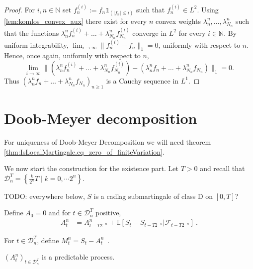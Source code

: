 \begin{proof}
  For $i,n\in\mathbb{N}$ set $f_{n}^{(i)}:=f_n \mathbb{1}_{(|f_n|\leq i)}$ such that $f_{n}^{(i)}\in L^2$.
  Using \ref{lem:komlos_convex_aux} there exist for every $n$ convex weights $\lambda_n^{n}, \ldots, \lambda_{N_n}^{n}$ such that the functions
  $ \lambda_n^{n} f_n^{(i)} + \ldots+\lambda_{N_n}^{n} f_{N_n}^{(i)}$ converge in $L^2$ for every $i\in\mathbb{N}$.
  By uniform integrability, $\lim_{i\to \infty}\| f^{(i)}_n- f_n\|_1=0$, uniformly with respect to $n$.
  Hence, once again, uniformly with respect to $n$,
  $$ \textstyle\lim_{i\to\infty}\|  (\lambda_n^{n} f_n^{(i)} + \ldots+\lambda_{N_n}^{n} f_{N_n}^{(i)})-(\lambda_n^{n} f_n + \ldots+\lambda_{N_n}^{n} f_{N_n})\|_1= 0.$$
  Thus $(\lambda_n^{n} f_n + \ldots+\lambda_{N_n}^{n} f_{N_n})_{n\geq 1}$  is a Cauchy sequence in $L^1$.
\end{proof}



\section{Doob-Meyer decomposition}



For uniqueness of Doob-Meyer Decomposition we will need theorem \ref{thm:IsLocalMartingale.eq_zero_of_finiteVariation}.

We now start the construction for the existence part.
Let $T>0$ and recall that $\mathcal{D}_n^T=\left\lbrace \frac{k}{2^n}T \mid k=0,\cdots 2^n\right\rbrace$.

TODO: everywhere below, $S$ is a cadlag submartingale of class D on $[0,T]$?

\begin{definition}[A]\label{def:A}
Define $A_0=0$ and for $t\in\mathcal{D}_n^T$ positive,
\begin{align*}
A^n_t
&=A^n_{t-T2^{-n}} + \mathbb{E}\left[ S_t-S_{t-T2^{-n}}|\mathcal{F}_{t-T2^{-n}}\right]
\: .
\end{align*}
\end{definition}


\begin{definition}[M]\label{def:M}
For $t\in\mathcal{D}_n^T$, define $M^n_t = S_t-A^n_t$~.
\end{definition}


\begin{lemma}\label{lem:Doob_Meyer_Finite_Predictable}
  $(A^n_t)_{t\in\mathcal{D}_n^T}$ is a predictable process.
\end{lemma}

